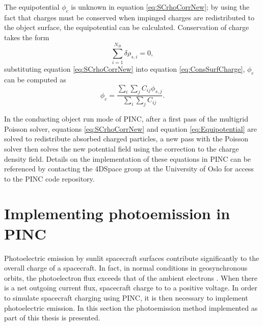 The equipotential $\phi_c$ is unknown in equation \eqref{eq:SCrhoCorrNew}; by using the fact that charges must be conserved when impinged charges are redistributed to the object surface, the equipotential can be calculated. Conservation of charge takes the form
\begin{equation}\label{eq:ConsSurfCharge}
    \sum^{N_B}_{i=1} \delta \rho_{s,i} = 0,
\end{equation}
substituting equation \eqref{eq:SCrhoCorrNew} into equation \eqref{eq:ConsSurfCharge}, $\phi_c$ can be computed as
\begin{equation}\label{eq:Equipotential}
    \phi_c = \frac{\sum_i \sum_j C_{ij} \phi_{s,j}}{\sum_i \sum_j C_{ij}}.
\end{equation}

In the conducting object run mode of PINC, after a first pass of the multigrid Poisson solver, equations \eqref{eq:SCrhoCorrNew} and equation \eqref{eq:Equipotential} are solved to redistribute absorbed charged particles, a new pass with the Poisson solver then solves the new potential field using the correction to the charge density field. Details on the implementation of these equations in PINC can be referenced by contacting the 4DSpace group at the University of Oslo for access to the PINC code repository.

\newpage

\section{Implementing photoemission in PINC}

Photoelectric emission by sunlit spacecraft surfaces contribute significantly to the overall charge of a spacecraft. In fact, in normal conditions in geosynchronous orbits, the photoelectron flux exceeds that of the ambient electrons \parencite{Lai2006}. When there is a net outgoing current flux, spacecraft charge to to a positive voltage. In order to simulate spacecraft charging using PINC, it is then necessary to implement photoelectric emission. In this section the photoemission method implemented as part of this thesis is presented. 


